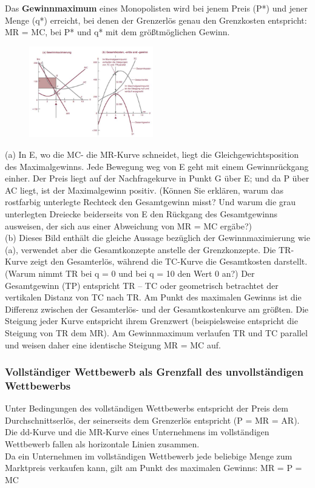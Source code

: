 \documentclass[10pt]{scrartcl}
\begin{document}
Das {\bf Gewinnmaximum } eines Monopolisten wird bei jenem Preis (P*) und jener Menge (q*) erreicht, bei denen der Grenzerlös genau den Grenzkosten entspricht:\\ 
MR = MC, bei P* und q* mit dem größtmöglichen Gewinn.\\
\newpage
\begin{figure}
  \begin{center}
  	\vspace{-10pt}
    \includegraphics[width=0.48\textwidth]{img/gewinnmaximierung.jpg}
    \vspace{-10pt}
    \end{center}
\end{figure}
(a) In E, wo die MC- die MR-Kurve schneidet, liegt die Gleichgewichtsposition des Maximalgewinns. Jede Bewegung weg von E geht mit einem Gewinnrückgang einher. Der Preis liegt auf der Nachfragekurve in Punkt G über E; und da P über AC liegt, ist der Maximalgewinn positiv. (Können Sie erklären, warum das rostfarbig unterlegte Rechteck den Gesamtgewinn misst? Und warum die grau unterlegten Dreiecke beiderseits von E den Rückgang des Gesamtgewinns ausweisen, der sich aus einer Abweichung von MR = MC ergäbe?)\\
(b) Dieses Bild enthält die gleiche Aussage bezüglich der Gewinnmaximierung wie (a), verwendet aber die Gesamtkonzepte anstelle der Grenzkonzepte. Die TR-Kurve zeigt den Gesamterlös, während die TC-Kurve die Gesamtkosten darstellt. (Warum nimmt TR bei q = 0 und bei q = 10 den Wert 0 an?) Der Gesamtgewinn (TP) entspricht TR – TC oder geometrisch betrachtet der vertikalen Distanz von TC nach TR. Am Punkt des maximalen Gewinns ist die Differenz zwischen der Gesamterlös- und der Gesamtkostenkurve am größten. Die Steigung jeder Kurve entspricht ihrem Grenzwert (beispielsweise entspricht die Steigung von TR dem MR). Am Gewinnmaximum verlaufen TR und TC parallel und weisen daher eine identische Steigung MR = MC auf.
\subsubsection{Vollständiger Wettbewerb als Grenzfall des unvollständigen Wettbewerbs}
Unter Bedingungen des vollständigen Wettbewerbs entspricht der Preis dem Durchschnittserlös, der seinerseits dem Grenzerlös entspricht (P = MR = AR). Die dd-Kurve und die MR-Kurve eines Unternehmens im vollständigen Wettbewerb fallen als horizontale Linien zusammen. \\
Da ein Unternehmen im vollständigen Wettbewerb jede beliebige Menge zum Marktpreis verkaufen kann, gilt am Punkt des maximalen Gewinns: MR = P = MC
\end{document}
